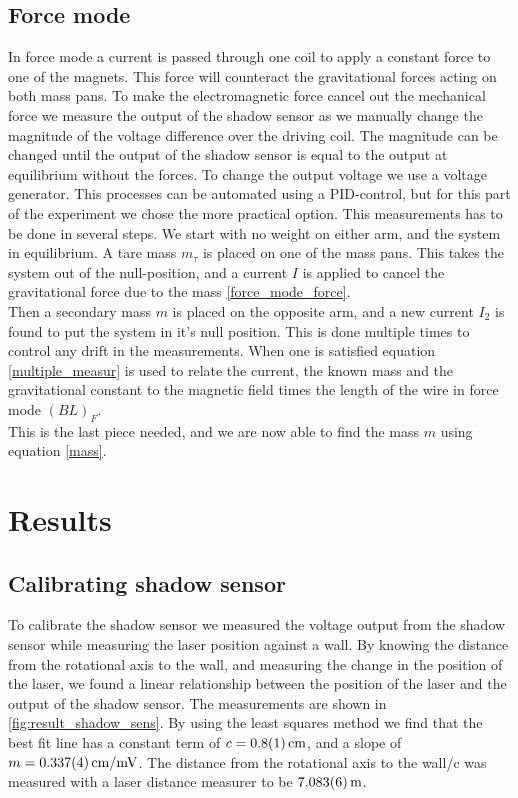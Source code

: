 \documentclass[english,a4paper,12pt,reprint]{revtex4-1}
\begin{document}
\subsection{Force mode}
In force mode a current is passed through one coil to apply a constant force to one of the magnets. This force will counteract the gravitational forces acting on both mass pans. To make the electromagnetic force cancel out the mechanical force we measure the output of the shadow sensor as we manually change the magnitude of the voltage difference over the driving coil. The magnitude can be changed until the output of the shadow sensor is equal to the output at equilibrium without the forces. To change the output voltage we use a voltage generator. This processes can be automated using a PID-control, but for this part of the experiment we chose the more practical option.
This measurements has to be done in several steps. We start with no weight on either arm, and the system in equilibrium. A tare mass $m_\tau$ is placed on one of the mass pans. This takes the system out of the null-position, and a current $I$ is applied to cancel the gravitational force due to the mass \eqref{force_mode_force}. \\
Then a secondary mass $m$ is placed on the opposite arm, and a new current $I_2$ is found to put the system in it's null position. This is done multiple times to control any drift in the measurements. When one is satisfied equation \eqref{multiple_measur} is used to relate the current, the known mass and the gravitational constant to the magnetic field times the length of the wire in force mode $(BL)_F$.\\
This is the last piece needed, and we are now able to find the mass $m$ using equation \eqref{mass}.


\section{Results}
\subsection{Calibrating shadow sensor}
To calibrate the shadow sensor we measured the voltage output from the shadow sensor while measuring the laser position against a wall. By knowing the distance from the rotational axis to the wall, and measuring the change in the position of the laser, we found a linear relationship between the position of the laser and the output of the shadow sensor. The measurements are shown in \vref{fig:result_shadow_sens}. By using the least squares method we find that the best fit line has a constant term of $c = \SI{0.8\pm0.1}{\centi\meter}$, and a slope of $m = \SI{0.337\pm0.004}{\centi\meter/\milli\volt}$. The distance from the rotational axis to the wall/c was measured with a laser distance measurer to be $\SI{7.083\pm0.006}{\meter}$.
\end{document}
